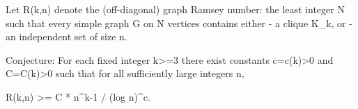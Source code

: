 Let R(k,n) denote the (off-diagonal) graph Ramsey number: the least integer N such that
every simple graph G on N vertices contains either
- a clique K_k, or
- an independent set of size n.

Conjecture:
For each fixed integer k>=3 there exist constants c=c(k)>0 and C=C(k)>0 such that for all
sufficiently large integers n,

  R(k,n) >= C * n^{k-1} / (log n)^c.
